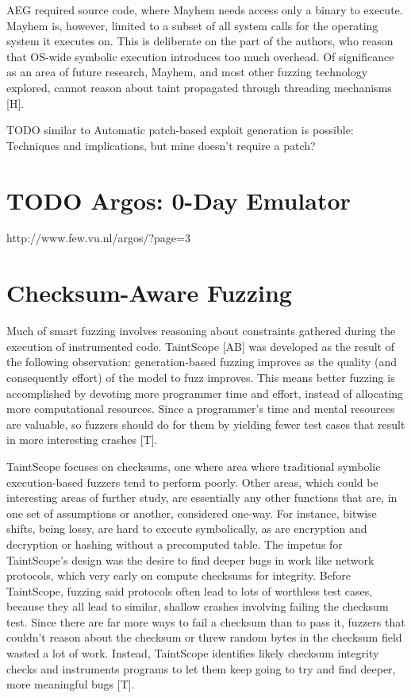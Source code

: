 \documentclass[11pt,expanded,copyright]{fsuthesis}
\begin{document}
AEG required source code, where Mayhem needs access only a binary to execute. Mayhem is, however, limited to a subset of all system calls for the operating system it executes on. This is deliberate on the part of the authors, who reason that OS-wide symbolic execution introduces too much overhead. Of significance as an area of future research, Mayhem, and most other fuzzing technology explored, cannot reason about taint propagated through threading mechanisms [H].


TODO similar to Automatic patch-based exploit generation is possible: Techniques and
implications, but mine doesn't require a patch?

\section{TODO Argos: 0-Day Emulator}

http://www.few.vu.nl/argos/?page=3

\section{Checksum-Aware Fuzzing}

Much of smart fuzzing involves reasoning about constraints gathered during the execution of instrumented code. TaintScope [AB] was developed as the result of the following observation: generation-based fuzzing improves as the quality (and consequently effort) of the model to fuzz improves. This means better fuzzing is accomplished by devoting more programmer time and effort, instead of allocating more computational resources. Since a programmer's time and mental resources are valuable, so fuzzers should do for them by yielding fewer test cases that result in more interesting crashes [T].

TaintScope focuses on checksums, one where area where traditional symbolic execution-based fuzzers tend to perform poorly. Other areas, which could be interesting areas of further study, are essentially any other functions that are, in one set of assumptions or another, considered one-way. For instance, bitwise shifts, being lossy, are hard to execute symbolically, as are encryption and decryption or hashing without a precomputed table. The impetus for TaintScope's design was the desire to find deeper bugs in work like network protocols, which very early on compute checksums for integrity. Before TaintScope, fuzzing said protocols often lead to lots of worthless test cases, because they all lead to similar, shallow crashes involving failing the checksum test. Since there are far more ways to fail a checksum than to pass it, fuzzers that couldn't reason about the checksum or threw random bytes in the checksum field wasted a lot of work. Instead, TaintScope identifies likely checksum integrity checks and instruments programs to let them keep going to try and find deeper, more meaningful bugs [T].
\end{document}
